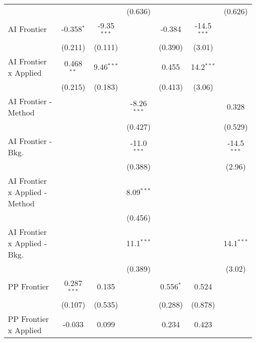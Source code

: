 \begin{tabular}{lcccccc}
                                  &                &               & (0.636)       &               &               & (0.626)\\   
   AI Frontier                    & -0.358$^{*}$   & -9.35$^{***}$ &               & -0.384        & -14.5$^{***}$ &   \\   
                                  & (0.211)        & (0.111)       &               & (0.390)       & (3.01)        &   \\   
   AI Frontier x Applied          & 0.468$^{**}$   & 9.46$^{***}$  &               & 0.455         & 14.2$^{***}$  &   \\   
                                  & (0.215)        & (0.183)       &               & (0.413)       & (3.06)        &   \\   
   AI Frontier - Method           &                &               & -8.26$^{***}$ &               &               & 0.328\\   
                                  &                &               & (0.427)       &               &               & (0.529)\\   
   AI Frontier - Bkg.             &                &               & -11.0$^{***}$ &               &               & -14.5$^{***}$\\   
                                  &                &               & (0.388)       &               &               & (2.96)\\   
   AI Frontier x Applied - Method &                &               & 8.09$^{***}$  &               &               &   \\   
                                  &                &               & (0.456)       &               &               &   \\   
   AI Frontier x Applied - Bkg.   &                &               & 11.1$^{***}$  &               &               & 14.1$^{***}$\\   
                                  &                &               & (0.389)       &               &               & (3.02)\\   
   PP Frontier                    & 0.287$^{***}$  & 0.135         &               & 0.556$^{*}$   & 0.524         &   \\   
                                  & (0.107)        & (0.535)       &               & (0.288)       & (0.878)       &   \\   
   PP Frontier x Applied          & -0.033         & 0.099         &               & 0.234         & 0.423         &   \\   

\end{tabular}
